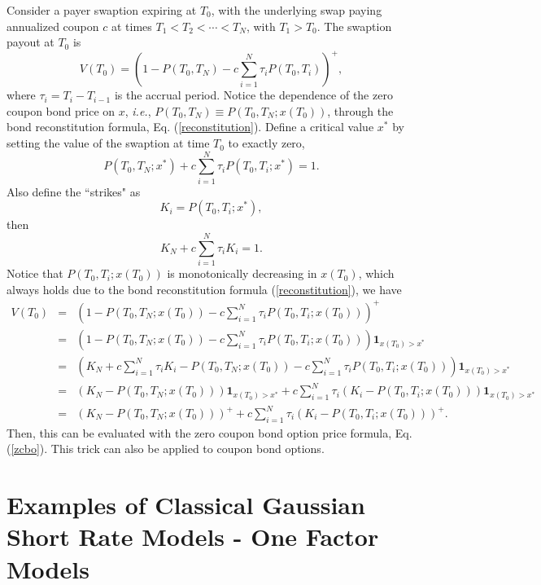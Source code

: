 \documentclass[12pt]{article}
\begin{document}
  Consider a payer swaption expiring at $T_0$, with the underlying swap paying annualized coupon $c$ at times
  $T_1<T_2<\cdots<T_N$, with $T_1>T_0$. The swaption payout at $T_0$ is
  \begin{equation}
    V(T_0) = \left(1-P(T_0,T_N)-c\sum_{i=1}^N\tau_iP(T_0,T_i)\right)^+,
  \end{equation}
  where $\tau_i=T_i-T_{i-1}$ is the accrual period. Notice the dependence of the zero coupon bond price on $x$, {\it i.e.},
  $P(T_0,T_N)\equiv P(T_0,T_N;x(T_0))$, through the bond reconstitution formula, Eq. (\ref{reconstitution}). Define a
  critical value $x^*$ by setting the value of the swaption at time $T_0$ to exactly zero,
  \begin{equation}
    P(T_0,T_N;x^*)+c\sum_{i=1}^N\tau_iP(T_0,T_i;x^*)=1.
  \end{equation}
  Also define the ``strikes" as
  \begin{equation}
    K_i=P(T_0,T_i;x^*),
  \end{equation}
  then
  \begin{equation}
    K_N+c\sum_{i=1}^N\tau_iK_i=1.
  \end{equation}
  Notice that $P(T_0,T_i;x(T_0))$ is monotonically decreasing in $x(T_0)$, which always holds due to the bond reconstitution
  formula (\ref{reconstitution}), we have
  \begin{eqnarray}
    V(T_0)&=&\left(1-P(T_0,T_N;x(T_0))-c\sum_{i=1}^N\tau_iP(T_0,T_i;x(T_0))\right)^+\nonumber\\
          &=&\left(1-P(T_0,T_N;x(T_0))-c\sum_{i=1}^N\tau_iP(T_0,T_i;x(T_0))\right)\textbf{1}_{x(T_0)>x^*}\nonumber\\
          &=&\left(K_N+c\sum_{i=1}^N\tau_iK_i-P(T_0,T_N;x(T_0))-c\sum_{i=1}^N\tau_iP(T_0,T_i;x(T_0))\right)\textbf{1}_{x(T_0)>x^*}\nonumber\\
          &=&\left(K_N-P(T_0,T_N;x(T_0))\right)\textbf{1}_{x(T_0)>x^*}
                    + c\sum_{i=1}^N\tau_i\left(K_i-P(T_0,T_i;x(T_0))\right)\textbf{1}_{x(T_0)>x^*}\nonumber\\
          &=&\left(K_N-P(T_0,T_N;x(T_0))\right)^+
       + c\sum_{i=1}^N\tau_i\left(K_i-P(T_0,T_i;x(T_0))\right)^+.
  \end{eqnarray}
  Then, this can be evaluated with the zero coupon bond option price formula, Eq. (\ref{zcbo}).
  This trick can also be applied to coupon bond options.

\section{Examples of Classical Gaussian Short Rate Models - One Factor Models}
\end{document}
